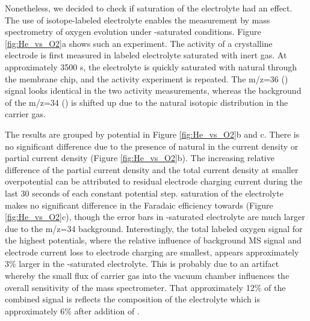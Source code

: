 Nonetheless, we decided to check if  saturation of the electrolyte had an effect. The use of isotope-labeled electrolyte enables the measurement by mass spectrometry of oxygen evolution under -saturated conditions. Figure \ref{fig:He_vs_O2}a shows such an experiment. The activity of a crystalline  electrode is first measured in labeled electrolyte saturated with inert gas. At approximately 3500 s, the electrolyte is quickly saturated with natural  through the membrane chip, and the activity experiment is repeated. The m/z=36 () signal looks identical in the two activity measurements, whereas the background of the m/z=34 () is shifted up due to the natural isotopic distribution in the  carrier gas. 

The results are grouped by potential in Figure \ref{fig:He_vs_O2}b and c. There is no significant difference due to the presence of natural  in the current density or  partial current density (Figure \ref{fig:He_vs_O2}b). The increasing relative difference of the  partial current density and the total current density at smaller overpotential can be attributed to residual electrode charging current during the last 30 seconds of each constant potential step.  saturation of the electrolyte makes no significant difference in the Faradaic efficiency towards  (Figure \ref{fig:He_vs_O2}c), though the error bars in -saturated electrolyte are much larger due to the m/z=34 background. Interestingly, the total labeled oxygen signal for the highest potentials, where the relative influence of background MS signal and electrode current loss to electrode charging are smallest, appears approximately 3\% larger in the -saturated electrolyte. This is probably due to an artifact whereby the small flux of  carrier gas into the vacuum chamber influences the overall sensitivity of the mass spectrometer. That approximately 12\% of the combined  signal is  reflects the composition of the electrolyte which is approximately 6\%  after addition of .

